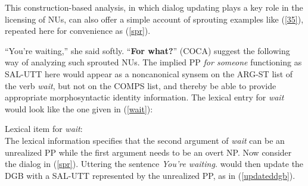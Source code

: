 \documentclass[output=paper
	        ,collection
	        ,collectionchapter
 	        ,biblatex
                ,babelshorthands
                ,newtxmath
                ,draftmode
                ,colorlinks, citecolor=brown
]{langscibook}
\begin{document}
{This construction-based analysis, in which dialog updating plays
a key role in the licensing of NUs, can also offer a simple account of sprouting examples like (\ref{35}), repeated here for convenience as (\ref{spr}).

\ea ``You're waiting,'' she said softly. ``\textbf{For what?}'' (COCA) \label{spr} \z
%
\citet[331]{Ginzburg:Sag:2000} suggest the following way of analyzing such sprouted NUs. The implied PP \textit{for someone} functioning as SAL-UTT here would appear as a noncanonical synsem on the ARG-ST list of the verb \textit{wait}, but not on the COMPS list, and thereby be able to provide appropriate morphosyntactic identity information. The lexical entry for \textit{wait} would look like the one given in (\ref{wait}):


\ea
\label{wait}
Lexical item for \textit{wait}:\\
\z
%
The lexical information specifies that the second argument of \textit{wait} can be an unrealized PP while the first argument needs to be an overt NP. Now consider the dialog in (\ref{spr}). Uttering
the sentence \textit{You're waiting.} would then update the DGB with a SAL-UTT represented by the unrealized PP, as in (\ref{updateddgb}).
%
\ea
\label{updateddgb}
}
\end{document}
